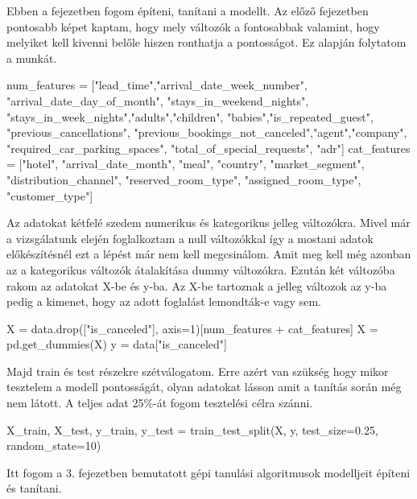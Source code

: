 
Ebben a fejezetben fogom építeni, tanítani a modellt. Az előző fejezetben pontosabb képet kaptam, hogy mely változók a fontosabbak valamint, hogy melyiket kell kivenni belőle hiszen ronthatja a pontosságot. Ez alapján folytatom a munkát.


\begin{python}
num_features = ["lead_time","arrival_date_week_number",
                "arrival_date_day_of_month",
                "stays_in_weekend_nights",
                "stays_in_week_nights","adults","children",
                "babies","is_repeated_guest", "previous_cancellations",
                "previous_bookings_not_canceled","agent","company",
                "required_car_parking_spaces", 
                "total_of_special_requests", "adr"]
cat_features = ["hotel", "arrival_date_month", "meal", 
                "country", "market_segment", 
                "distribution_channel", "reserved_room_type", 
                "assigned_room_type", "customer_type"]
\end{python}

Az adatokat kétfelé szedem numerikus és kategorikus jelleg változókra. Mivel már a vizsgálatunk elején foglalkoztam a null változókkal így a mostani adatok előkészítésnél ezt a lépést már nem kell megcsinálom. Amit meg kell még azonban az a kategorikus változók átalakítása dummy változókra. Ezután két változóba rakom az adatokat X-be és y-ba. Az X-be tartoznak a jelleg változok az y-ba pedig a kimenet, hogy az adott foglalást lemondták-e vagy sem.

\begin{python}
X = data.drop(["is_canceled"], axis=1)[num_features + cat_features]
X = pd.get_dummies(X)
y = data["is_canceled"]
\end{python}

Majd train és test részekre szétválogatom. Erre azért van szükség hogy mikor tesztelem a modell pontosságát, olyan adatokat lásson amit a tanítás során még nem látott. A teljes adat 25\%-át fogom tesztelési célra szánni.

\begin{python}
X_train, X_test, y_train, y_test = train_test_split(X, y,
    test_size=0.25, random_state=10)
\end{python}

Itt fogom a 3. fejezetben bemutatott gépi tanulási algoritmusok modelljeit építeni és tanítani.

